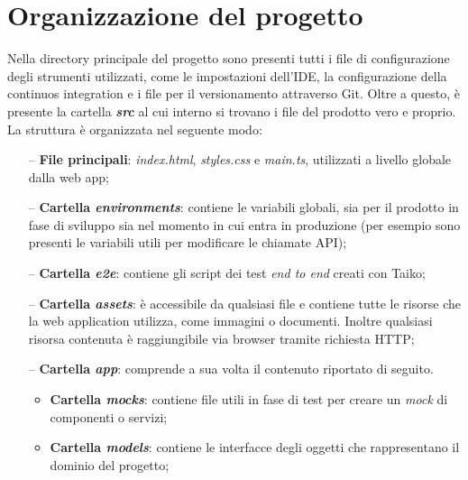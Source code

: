 \documentclass[11pt]{article}
\begin{document}


\frontespizio 
\fancydoc
%
\newpage
\tableofcontents
\newpage


\section{Organizzazione del progetto}
Nella directory principale del progetto sono presenti tutti i file di configurazione degli strumenti utilizzati, come le impostazioni dell'IDE, la configurazione della continuos integration e i file per il versionamento attraverso Git. Oltre a questo, è presente la cartella \textbf{\textit{src}} al cui interno si trovano i file del prodotto vero e proprio. La struttura è organizzata nel seguente modo:
\begin{itemize}
    \item[--] \textbf{File principali}: \textit{index.html}, \textit{styles.css} e \textit{main.ts}, utilizzati a livello globale dalla web app;
    
    \item[--] \textbf{Cartella \textit{environments}}: contiene le variabili globali, sia per il prodotto in fase di sviluppo sia nel momento in cui entra in produzione (per esempio sono presenti le variabili utili per modificare le chiamate API); 
    
    \item[--] \textbf{Cartella \textit{e2e}}: contiene gli script dei test \textit{end to end} creati con Taiko;
    
    \item[--] \textbf{Cartella \textit{assets}}: è accessibile da qualsiasi file e contiene tutte le risorse che la web application utilizza, come immagini o documenti. Inoltre qualsiasi risorsa contenuta è raggiungibile via browser tramite richiesta HTTP;
    
    \item[--] \textbf{Cartella \textit{app}}: comprende a sua volta il contenuto riportato di seguito.
    
        \begin{itemize}
            \item \textbf{Cartella \textit{mocks}}: contiene file utili in fase di test per creare un \textit{mock} di componenti o servizi;
            
            \item \textbf{Cartella \textit{models}}: contiene le interfacce degli oggetti che rappresentano il dominio del progetto;
            

\end{itemize}
\end{itemize}
\end{document}
